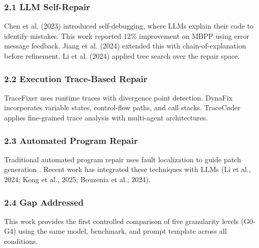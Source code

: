
\subsubsection{2.1 LLM Self-Repair}

Chen et al. (2023) introduced self-debugging, where LLMs explain their code to identify mistakes. This work reported 12\% improvement on MBPP using error message feedback. Jiang et al. (2024) extended this with chain-of-explanation before refinement. Li et al. (2024) applied tree search over the repair space.

\subsubsection{2.2 Execution Trace-Based Repair}

TraceFixer \citep{bouzenia2024repairagent} uses runtime traces with divergence point detection. DynaFix \citep{huang2025dynafix} incorporates variable states, control-flow paths, and call stacks. TraceCoder \citep{Huang2026} applies fine-grained trace analysis with multi-agent architectures.

\subsubsection{2.3 Automated Program Repair}

Traditional automated program repair uses fault localization to guide patch generation \citep{dikici2025apr}. Recent work has integrated these techniques with LLMs (Li et al., 2024; Kong et al., 2025; Bouzenia et al., 2024).

\subsubsection{2.4 Gap Addressed}

This work provides the first controlled comparison of five granularity levels (G0-G4) using the same model, benchmark, and prompt template across all conditions.
